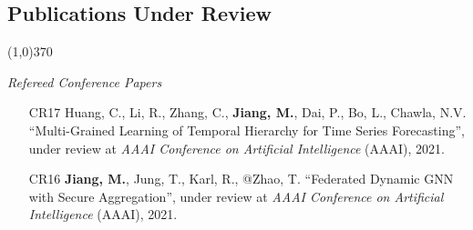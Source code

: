 \documentclass[10pt]{article}
\newenvironment{myindentpar}[1]%
{\begin{list}{}%
         {\setlength{\leftmargin}{#1}}%
         \item[]%
}
{\end{list}}
\newcounter{list}
\begin{document}
\subsection{\sc Publications Under Review}
\vspace{-0.4cm} \line(1,0){370} \vspace{-0.1cm}

\begin{myindentpar}{0.00cm}

\vspace{.2cm}\hspace{-0.25cm}\textit{Refereed Conference Papers}

\begin{enumerate}[leftmargin=.5cm]


		


		
\item[CR17] Huang, C., Li, R., Zhang, C., \textbf{Jiang, M.}, Dai, P., Bo, L., Chawla, N.V. ``Multi-Grained Learning of Temporal Hierarchy for Time Series Forecasting'', under review at \textit{AAAI Conference on Artificial Intelligence} (AAAI), 2021.

\item[CR16] \textbf{Jiang, M.}, Jung, T., Karl, R., @Zhao, T. ``Federated Dynamic GNN with Secure Aggregation'', under review at \textit{AAAI Conference on Artificial Intelligence} (AAAI), 2021.


\end{enumerate}
\end{myindentpar}
\end{document}

